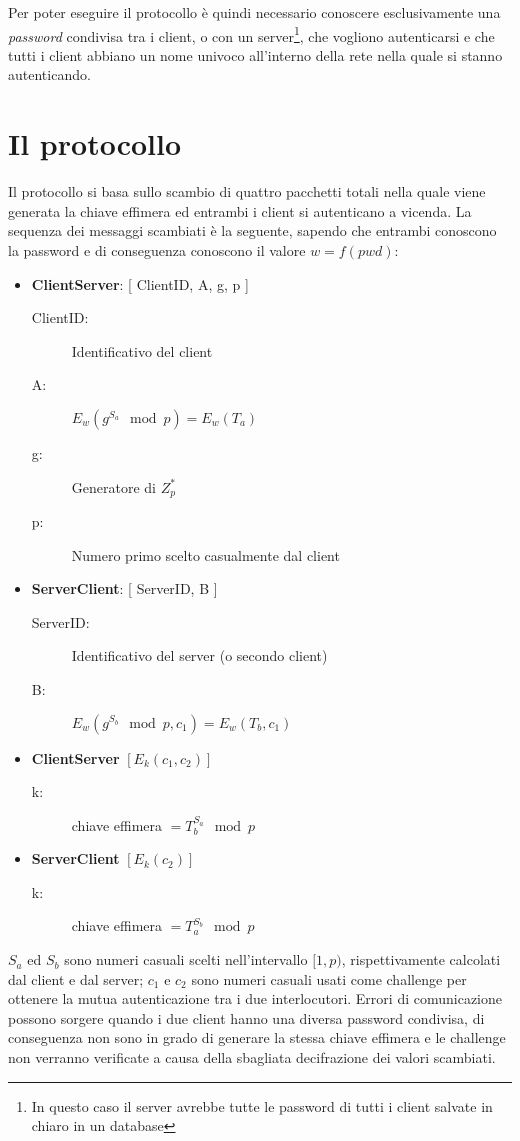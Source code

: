 \documentclass[10pt, letterpaper]{article}
\begin{document}
Per poter eseguire il protocollo è quindi necessario conoscere esclusivamente
una \textit{password} condivisa tra i client, o con un server\footnote{In questo
caso il server avrebbe tutte le password di tutti i client salvate in chiaro in
un database}, che vogliono autenticarsi e che tutti i client abbiano un nome
univoco all'interno della rete nella quale si stanno autenticando.

\section{Il protocollo}
Il protocollo si basa sullo scambio di quattro pacchetti totali nella quale
viene generata la chiave effimera ed entrambi i client si autenticano a vicenda.
La sequenza dei messaggi scambiati è la seguente, sapendo che entrambi conoscono
la password e di conseguenza conoscono il valore $w=f(pwd)$:
\begin{itemize}
	\item \textbf{Client\textrightarrow Server}: {[} ClientID, A, g, p {]}
		\begin{description}
			\item [ClientID:] Identificativo del client
			\item [A:] $E_w( g^{S_a} \mod p ) = E_w( T_a )$
			\item [g:] Generatore di $Z_p^*$
			\item [p:] Numero primo scelto casualmente dal client
		\end{description}
	\item \textbf{Server\textrightarrow Client}: {[} ServerID, B {]}
		\begin{description}
			\item [ServerID:] Identificativo del server (o secondo client)
			\item [B:] $E_w( g^{S_b} \mod p, c_1 ) = E_w( T_b, c_1 )$
		\end{description}
	\item \textbf{Client\textrightarrow Server} $[E_k( c_1, c_2 )]$
		\begin{description}
			\item [k:] chiave effimera $= T_b^{S_a} \mod p$
		\end{description}
	\item \textbf{Server\textrightarrow Client} $[E_k( c_2 )]$
		\begin{description}
			\item [k:] chiave effimera $= T_a^{S_b} \mod p$
		\end{description}
\end{itemize}
$S_a$ ed $S_b$ sono numeri casuali scelti nell'intervallo $[1,p)$,
rispettivamente calcolati dal client e dal server; $c_1$ e $c_2$ sono numeri
casuali usati come challenge per ottenere la mutua autenticazione tra i due
interlocutori.
Errori di comunicazione possono sorgere quando i due client hanno una diversa
password condivisa, di conseguenza non sono in grado di generare la stessa
chiave effimera e le challenge non verranno verificate a causa della sbagliata
decifrazione dei valori scambiati.
\end{document}
